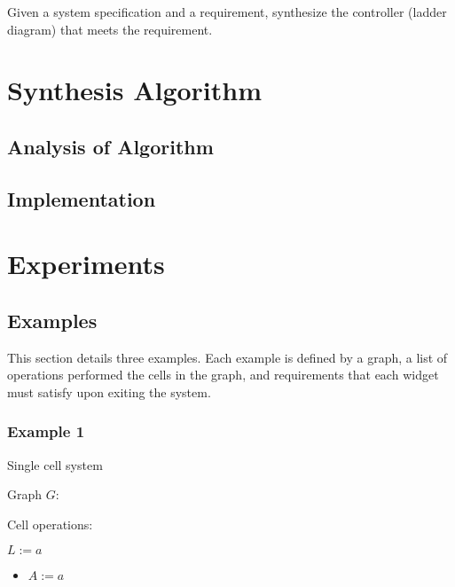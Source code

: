 \documentclass[9pt,conference, compsocconf]{IEEEtran}
\begin{document}
Given a system specification and a requirement, synthesize the controller (ladder diagram) that meets the requirement.

\section{Synthesis Algorithm}
\label{sec:algo}

\subsection{Analysis of Algorithm}

\subsection{Implementation}


\section{Experiments}
\label{sec:experiments}

\subsection{Examples}
\label{sec:examples}
This section details three examples. Each example is defined by a graph, a list of operations performed the cells in the graph, and requirements that each widget must satisfy upon exiting the system.

\subsubsection{Example 1} Single cell system
\label{sec:example1}

	Graph $G$:
	\begin{center}
	\end{center}

	Cell operations: \hfill
	
	$L := {a}$
	\begin{itemize}
		\item $A := {a}$
	\end{itemize}
	\hfill
	
\end{document}
